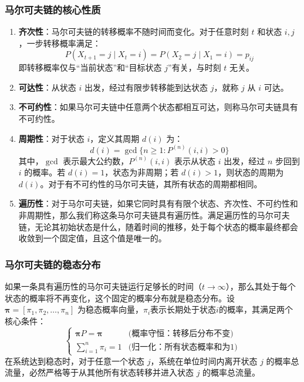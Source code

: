 \subsubsection{马尔可夫链的核心性质}
\begin{enumerate}[wide]
    \item \textbf{齐次性}：马尔可夫链的转移概率不随时间而变化。对于任意时刻 $t$ 和状态 $i, j$，一步转移概率满足：
    \begin{equation}
        P(X_{t+1}=j \mid X_t=i) = P(X_2=j \mid X_1=i) = p_{ij}
    \end{equation}
    即转移概率仅与“当前状态”和“目标状态 $j$”有关，与时刻 $t$ 无关。

    \item \textbf{可达性}：从状态 $i$ 出发，经过有限步转移能到达状态 $j$，就称 $j$ 从 $i$ 可达。

    \item \textbf{不可约性}：如果马尔可夫链中任意两个状态都相互可达，则称马尔可夫链具有不可约性。

    \item \textbf{周期性}：对于状态 $i$，定义其周期 $d(i)$ 为：
    \begin{equation}
        d(i) = \gcd\{n \ge 1 : P^{(n)}(i,i) > 0\}
    \end{equation}
    其中，$\gcd$ 表示最大公约数，$P^{(n)}(i,i)$ 表示从状态 $i$ 出发，经过 $n$ 步回到 $i$ 的概率。若 $d(i)=1$，状态为非周期；若 $d(i)>1$，则状态的周期为 $d(i)$。对于有不可约性的马尔可夫链，其所有状态的周期都相同。

    \item \textbf{遍历性}：对于马尔可夫链，如果它同时具有有限个状态、齐次性、不可约性和非周期性，那么我们称这条马尔可夫链具有遍历性。满足遍历性的马尔可夫链，无论其初始状态是什么，随着时间的推移，处于每个状态的概率最终都会收敛到一个固定值，且这个值是唯一的。
\end{enumerate}

\subsubsection{马尔可夫链的稳态分布}
如果一条具有遍历性的马尔可夫链运行足够长的时间（$t \to \infty$），那么其处于每个状态的概率将不再变化，这个固定的概率分布就是稳态分布。设 $\boldsymbol{\pi} = [\pi_1, \pi_2, \dots, \pi_n]$ 为稳态概率向量，$\pi_i$表示长期处于状态$i$的概率，其满足两个核心条件：
\begin{equation}
    \begin{cases}
        \boldsymbol{\pi} P = \boldsymbol{\pi} & \text{(概率守恒：转移后分布不变)} \\
        \sum_{i=1}^{n} \pi_i = 1 & \text{(归一化：所有状态概率和为1)}
    \end{cases}
\end{equation}
在系统达到稳态时，对于任意一个状态 $j$，系统在单位时间内离开状态 $j$ 的概率总流量，必然严格等于从其他所有状态转移并进入状态 $j$ 的概率总流量。




